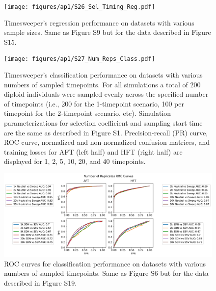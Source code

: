 \begin{figure}
    \centering
    \texttt{[image: figures/ap1/S26\_Sel\_Timing\_Reg.pdf]}
    \caption[Timesweeper’s regression performance on datasets with various sample sizes.]{Timesweeper’s regression performance on datasets with various sample sizes. Same as  Figure S9 but for the data described in Figure S15.}
    \label{fig:S26_Sel_Timing_Reg}
\end{figure}

\begin{figure}
    \centering
    \texttt{[image: figures/ap1/S27\_Num\_Reps\_Class.pdf]}
    \caption[Timesweeper’s classification performance on datasets with various numbers of sampled timepoints.]{Timesweeper’s classification performance on datasets with various numbers of sampled timepoints. For all simulations a total of 200 diploid individuals were sampled evenly across the specified number of timepoints (i.e., 200 for the 1-timepoint scenario, 100 per timepoint for the 2-timepoint scenario, etc). Simulation parameterizations for selection coefficient and sampling start time are the same as described in Figure S1. Precision-recall (PR) curve, ROC curve, normalized and non-normalized confusion matrices, and training losses for AFT (left half) and HFT (right half) are displayed for 1, 2, 5, 10, 20, and 40 timepoints.}
    \label{fig:S27_Num_Reps_Class}
\end{figure}

\begin{figure}
    \centering
    \includegraphics[width=\textwidth]{figures/ap1/S28_Num_Reps_ROC.pdf}
    \caption[ROC curves for classification performance on datasets with various numbers of sampled timepoints.]{ROC curves for classification performance on datasets with various numbers of sampled timepoints. Same as Figure S6 but for the data described in Figure S19.}
    \label{fig:S28_Num_Reps_ROC}
\end{figure}

